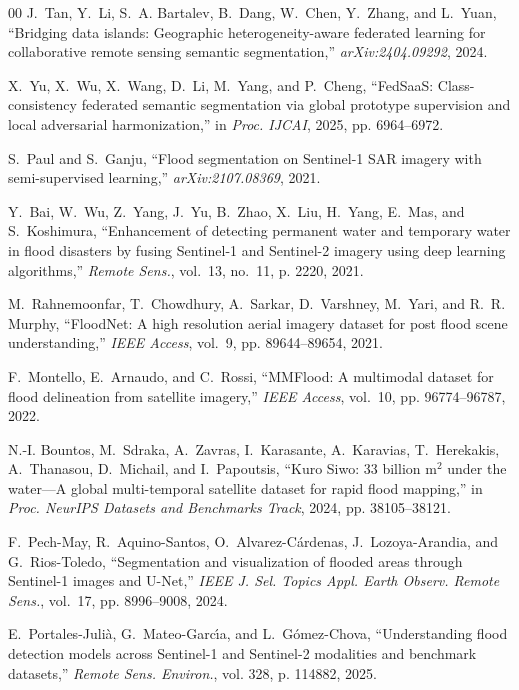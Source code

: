 \documentclass[conference]{IEEEtran}
\begin{document}
\begin{thebibliography}{00}
J.~Tan, Y.~Li, S.~A. Bartalev, B.~Dang, W.~Chen, Y.~Zhang, and L.~Yuan, ``Bridging data islands: Geographic heterogeneity-aware federated learning for collaborative remote sensing semantic segmentation,'' \emph{arXiv:2404.09292}, 2024.

X.~Yu, X.~Wu, X.~Wang, D.~Li, M.~Yang, and P.~Cheng, ``FedSaaS: Class-consistency federated semantic segmentation via global prototype supervision and local adversarial harmonization,'' in \emph{Proc. IJCAI}, 2025, pp. 6964--6972.

S.~Paul and S.~Ganju, ``Flood segmentation on Sentinel-1 SAR imagery with semi-supervised learning,'' \emph{arXiv:2107.08369}, 2021.

Y.~Bai, W.~Wu, Z.~Yang, J.~Yu, B.~Zhao, X.~Liu, H.~Yang, E.~Mas, and S.~Koshimura, ``Enhancement of detecting permanent water and temporary water in flood disasters by fusing Sentinel-1 and Sentinel-2 imagery using deep learning algorithms,'' \emph{Remote Sens.}, vol.~13, no.~11, p. 2220, 2021.

M.~Rahnemoonfar, T.~Chowdhury, A.~Sarkar, D.~Varshney, M.~Yari, and R.~R. Murphy, ``FloodNet: A high resolution aerial imagery dataset for post flood scene understanding,'' \emph{IEEE Access}, vol.~9, pp. 89644--89654, 2021.

F.~Montello, E.~Arnaudo, and C.~Rossi, ``MMFlood: A multimodal dataset for flood delineation from satellite imagery,'' \emph{IEEE Access}, vol.~10, pp. 96774--96787, 2022.

N.-I. Bountos, M.~Sdraka, A.~Zavras, I.~Karasante, A.~Karavias, T.~Herekakis, A.~Thanasou, D.~Michail, and I.~Papoutsis, ``Kuro Siwo: 33 billion m$^2$ under the water---A global multi-temporal satellite dataset for rapid flood mapping,'' in \emph{Proc. NeurIPS Datasets and Benchmarks Track}, 2024, pp. 38105--38121.

F.~Pech-May, R.~Aquino-Santos, O.~Alvarez-C{\'a}rdenas, J.~Lozoya-Arandia, and G.~Rios-Toledo, ``Segmentation and visualization of flooded areas through Sentinel-1 images and U-Net,'' \emph{IEEE J. Sel. Topics Appl. Earth Observ. Remote Sens.}, vol.~17, pp. 8996--9008, 2024.

E.~Portales-Juli{\`a}, G.~Mateo-Garc{\'\i}a, and L.~G{\'o}mez-Chova, ``Understanding flood detection models across Sentinel-1 and Sentinel-2 modalities and benchmark datasets,'' \emph{Remote Sens. Environ.}, vol. 328, p. 114882, 2025.


\end{thebibliography}
\end{document}
